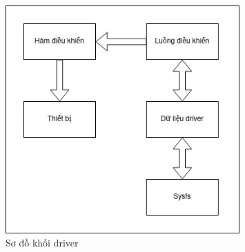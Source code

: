 
\begin{figure}[H]
	\centering
	\includegraphics[width=0.8\textwidth]{images/driver.jpg}
	\caption{Sơ đồ khối driver}
\end{figure}